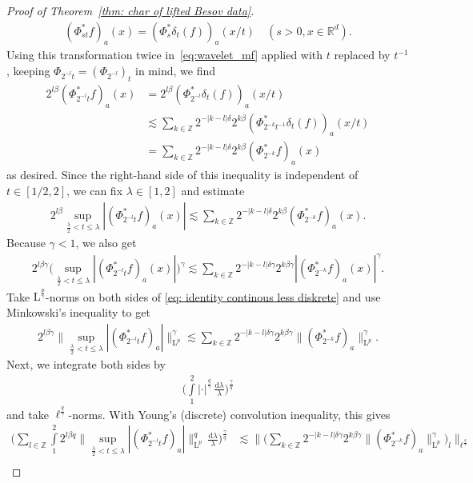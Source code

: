 \documentclass[11pt, leqno,parskip=half]{amsart}
\theoremstyle{definition}
\newcommand{\IR}{\mathbb{R}}
\newcommand{\IZ}{\mathbb{Z}}
\renewcommand{\L}{\mathrm{L}}
\renewcommand{\d}{\mathrm{d}}
\numberwithin{equation}{section}
\begin{document}
\begin{proof}[Proof of Theorem~\ref{thm: char of lifted Besov data}]
\begin{align}
    (\Phi_{st}^* f)_a(x) = (\Phi^*_s \delta_t(f))_a(x/t) \quad (s>0,x\in \IR^d).
\end{align}
Using this transformation twice in~\eqref{eq:wavelet_mf} applied with $t$ replaced by $t^{-1}$, keeping $\Phi_{2^{-l} t} = (\Phi_{2^{-l}})_t$ in mind, we find
\begin{align*}
    2^{l\beta}(\Phi_{2^{-l} t}^*f)_a(x) &= 2^{l\beta}(\Phi_{2^{-l}}^* \delta_t(f))_a(x/t) \\
    &\lesssim \sum\limits_{k\in\IZ} 2^{-|k-l|\delta} 2^{k\beta} (\Phi^*_{2^{-k} t^{-1}} \delta_t(f))_a(x/t) \\
    &= \sum\limits_{k\in\IZ} 2^{-|k-l|\delta} 2^{k\beta} (\Phi^*_{2^{-k}} f)_a(x)
\end{align*}
as desired.
Since the right-hand side of this inequality is independent of $t\in[1/2,2]$, we can fix $\lambda \in [1,2]$ and estimate
\begin{align*}
    2^{l\beta}\sup\limits_{\frac{\lambda}{2}<t\leq \lambda}|(\Phi^*_{2^{-l}t}f)_a(x) |\lesssim \sum\limits_{k\in\IZ} 2^{-|k-l|\delta} 2^{k\beta}(\Phi^*_{2^{-k}}f)_a(x).
\end{align*}
Because $\gamma < 1$, we also get
\begin{align}
\label{eq: identity continous less diskrete}
2^{l\beta\gamma}\Big(\sup\limits_{\frac{\lambda}{2}<t\leq \lambda}|(\Phi^*_{2^{-l}t}f)_a(x) |\Big)^\gamma\lesssim \sum\limits_{k\in\IZ} 2^{-|k-l|\delta\gamma} 2^{k\beta\gamma}|(\Phi^*_{2^{-k}}f)_a(x)|^\gamma.
\end{align}
Take $\L^\frac{p}{\gamma}$-norms on both sides of \eqref{eq: identity continous less diskrete} and use Minkowski's inequality to get
\begin{align*}
    2^{l\beta\gamma}\big\|\sup\limits_{\frac{\lambda}{2}<t\leq \lambda}|(\Phi^*_{2^{-l}t}f)_a| \big\|^\gamma_{\L^p} \lesssim \sum\limits_{k\in\IZ} 2^{-|k-l|\delta\gamma} 2^{k\beta\gamma}\|(\Phi^*_{2^{-k}}f)_a\|^\gamma_{\L^p}.
\end{align*}
Next, we integrate both sides by
\begin{align*}
    \bigg(\int\limits_1^2 |\cdot|^\frac{q}{\gamma}\,\frac{\d \lambda}{\lambda}\bigg)^\frac{\gamma}{q}
\end{align*}
and take $\ell^\frac{q}{\gamma}$-norms. With Young's (discrete) convolution inequality, this gives
\begin{align*}
    \bigg(\sum\limits_{l\in\IZ} \int\limits_1^2 2^{l\beta q}\big\|\sup\limits_{\frac{\lambda}{2}<t\leq \lambda}|(\Phi^*_{2^{-l}t}f)_a| \big\|_{\L^p}^q \,\frac{\d \lambda}{\lambda} \bigg)^\frac{\gamma}{q} &\lesssim \Big\|\Big(\sum\limits_{k\in\IZ} 2^{-|k-l|\delta\gamma} 2^{k\beta\gamma}\|(\Phi^*_{2^{-k}}f)_a\|^\gamma_{\L^p}\Big)_l\Big\|_{\ell^\frac{q}{\gamma}}\\

\end{align*}
\end{proof}
\end{document}
